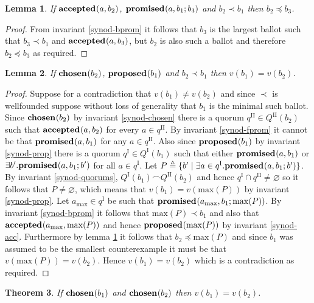 \documentclass[journal]{IEEEtran}
\newtheorem{theorem}{Theorem}
\newtheorem{lemma}[theorem]{Lemma}
\begin{document}
\begin{lemma}\label{synod-acc-bprom}If $\mathbf{accepted}_{}(a,b_2)$,
$\mathbf{promised}_{}(a,b_1;b_3)$ and $b_2 \prec b_1$ then $b_2 \preceq b_3$.\end{lemma}

\begin{proof} From invariant \ref{synod-bprom} it follows that $b_3$ is the
largest ballot such that $b_3 \prec b_1$ and $\mathbf{accepted}_{}(a,b_3)$, but $b_2$ is
also such a ballot and therefore $b_2 \preceq b_3$ as required.  \end{proof}

\begin{lemma}\label{synod-lemma} If $\mathbf{chosen}_{}(b_2)$, $\mathbf{proposed}_{}(b_1)$ and $b_2
\prec b_1$ then $v(b_1) = v(b_2)$. \end{lemma}

\begin{proof}Suppose for a contradiction that $v(b_1) \ne v(b_2)$ and since
$\prec$ is wellfounded suppose without loss of generality that $b_1$ is the
minimal such ballot.  Since $\mathbf{chosen}_{}(b_2)$ by invariant \ref{synod-chosen}
there is a quorum $q^\textrm{II} \in Q^\textrm{II}(b_2)$ such that
$\mathbf{accepted}_{}(a,b_2)$ for every $a \in q^\textrm{II}$.  By invariant
\ref{synod-fprom} it cannot be that $\mathbf{promised}_{}(a,b_1)$ for any $a \in
q^\textrm{II}$.  Also since $\mathbf{proposed}_{}(b_1)$ by invariant \ref{synod-prop} there
is a quorum $q^\textrm{I} \in Q^\textrm{I}(b_1)$ such that either
$\mathbf{promised}_{}(a,b_1)$ or $\exists b'.  \mathbf{promised}_{}(a,b_1;b')$ for all $a \in
q^\textrm{I}$.  Let $P \triangleq \{ b' \mid \exists a \in q^\textrm{I}.
\mathbf{promised}_{}(a,b_1;b') \}$.  By invariant \ref{synod-quorums},
${Q^\textrm{I}(b_1) \frown Q^\textrm{II}(b_2)}$ and hence $q^\textrm{I} \cap
q^\textrm{II} \ne \varnothing$ so it follows that $P \ne \varnothing$, which
means that $v(b_1) = v(\mathrm{max}(P))$ by invariant \ref{synod-prop}. Let
$a_{\mathrm{max}} \in q^\textrm{I}$ be such that
$\mathbf{promised}_{}(a_{\mathrm{max}},b_1;\mathrm{max}(P))$.  By invariant
\ref{synod-bprom} it follows that $\mathrm{max}(P) \prec b_1$ and also that
$\mathbf{accepted}_{}(a_{\mathrm{max}},\mathrm{max}(P))$ and hence
$\mathbf{proposed}_{}(\mathrm{max}(P))$ by invariant \ref{synod-acc}. Furthermore by lemma
\ref{synod-acc-bprom} it follows that $b_2 \preceq \mathrm{max}(P)$ and since
$b_1$ was assumed to be the smallest counterexample it must be that
$v(\mathrm{max}(P)) = v(b_2)$.  Hence $v(b_1) = v(b_2)$ which is a
contradiction as required.  \end{proof}

\begin{theorem}\label{synod-safety-theorem} If $\mathbf{chosen}_{}(b_1)$ and
$\mathbf{chosen}_{}(b_2)$ then $v(b_1) = v(b_2)$.  \end{theorem}
\end{document}
